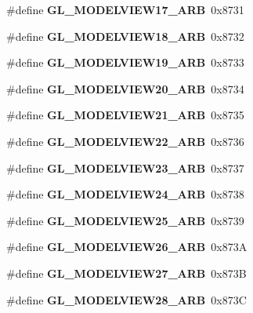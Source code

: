 \begin{DoxyCompactItemize}
\item 
\#define {\bfseries G\+L\+\_\+\+M\+O\+D\+E\+L\+V\+I\+E\+W17\+\_\+\+A\+R\+B}~0x8731\label{_s_d_l__opengl_8h_acdfd7a85cab798f8e14a42b4b4cf23b3}

\item 
\#define {\bfseries G\+L\+\_\+\+M\+O\+D\+E\+L\+V\+I\+E\+W18\+\_\+\+A\+R\+B}~0x8732\label{_s_d_l__opengl_8h_a2262cf727686c205f0caa6c0d278fc71}

\item 
\#define {\bfseries G\+L\+\_\+\+M\+O\+D\+E\+L\+V\+I\+E\+W19\+\_\+\+A\+R\+B}~0x8733\label{_s_d_l__opengl_8h_abe90204235839fcf2f22e8475a724954}

\item 
\#define {\bfseries G\+L\+\_\+\+M\+O\+D\+E\+L\+V\+I\+E\+W20\+\_\+\+A\+R\+B}~0x8734\label{_s_d_l__opengl_8h_a8de58099b0142fb99d353c73895e0cf2}

\item 
\#define {\bfseries G\+L\+\_\+\+M\+O\+D\+E\+L\+V\+I\+E\+W21\+\_\+\+A\+R\+B}~0x8735\label{_s_d_l__opengl_8h_ade827440bda3995911639746b687578f}

\item 
\#define {\bfseries G\+L\+\_\+\+M\+O\+D\+E\+L\+V\+I\+E\+W22\+\_\+\+A\+R\+B}~0x8736\label{_s_d_l__opengl_8h_aeee52676dd58650e79a6992ee01525d7}

\item 
\#define {\bfseries G\+L\+\_\+\+M\+O\+D\+E\+L\+V\+I\+E\+W23\+\_\+\+A\+R\+B}~0x8737\label{_s_d_l__opengl_8h_ae8cd306e49a5b92831d43f1c62419ae6}

\item 
\#define {\bfseries G\+L\+\_\+\+M\+O\+D\+E\+L\+V\+I\+E\+W24\+\_\+\+A\+R\+B}~0x8738\label{_s_d_l__opengl_8h_ae244b71b4055a0fd37b5674ae193839d}

\item 
\#define {\bfseries G\+L\+\_\+\+M\+O\+D\+E\+L\+V\+I\+E\+W25\+\_\+\+A\+R\+B}~0x8739\label{_s_d_l__opengl_8h_aabe837230691b8591dd75ac20647f666}

\item 
\#define {\bfseries G\+L\+\_\+\+M\+O\+D\+E\+L\+V\+I\+E\+W26\+\_\+\+A\+R\+B}~0x873\+A\label{_s_d_l__opengl_8h_a61065a2d525b87aa4fa95f4263b9eb00}

\item 
\#define {\bfseries G\+L\+\_\+\+M\+O\+D\+E\+L\+V\+I\+E\+W27\+\_\+\+A\+R\+B}~0x873\+B\label{_s_d_l__opengl_8h_aed581914d18b35d1630797eed90a7fa4}

\item 
\#define {\bfseries G\+L\+\_\+\+M\+O\+D\+E\+L\+V\+I\+E\+W28\+\_\+\+A\+R\+B}~0x873\+C\label{_s_d_l__opengl_8h_a926aca92e40048ee41f33944599d5f44}


\end{DoxyCompactItemize}
